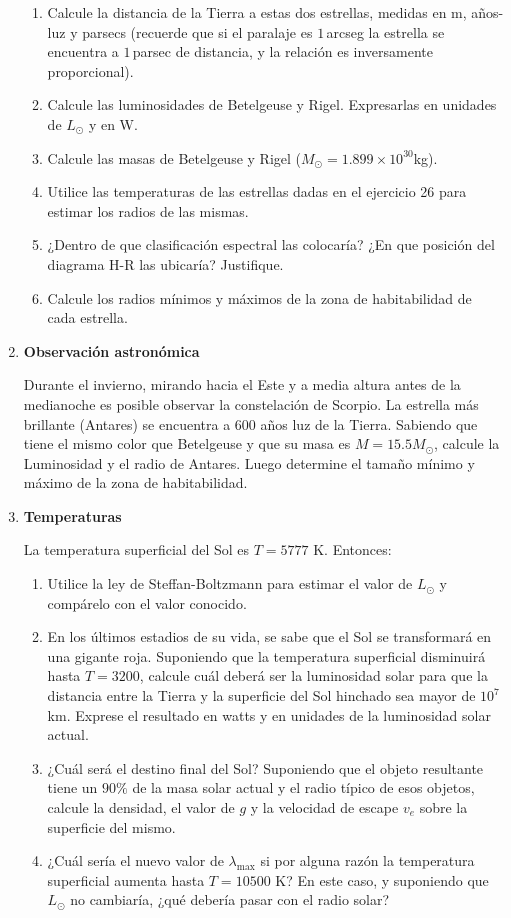 \documentclass[a4paper,12pt]{article}
\begin{document}
\begin{enumerate}
\begin{enumerate}
\item Calcule la distancia de la Tierra a estas dos estrellas, medidas en m,
años-luz y parsecs (recuerde que si el paralaje es $1$\,arcseg la estrella se
encuentra a $1$\,parsec de distancia, y la relación es inversamente
proporcional). 
\item Calcule las luminosidades de Betelgeuse y Rigel. Expresarlas en unidades
de $L_\odot$ y en W.
\item Calcule las masas de Betelgeuse y Rigel ($M_\odot =
1.899\times10^{30}$kg).
\item Utilice las temperaturas de las estrellas dadas en el ejercicio 26 para
estimar los radios de las mismas. 
\item ¿Dentro de que clasificación espectral las colocaría? ¿En que posición
del diagrama H-R las ubicaría? Justifique.
\item Calcule los radios mínimos y máximos de la zona de habitabilidad de cada estrella.
\end{enumerate}

\item{\bf{Observación astronómica}}

Durante el invierno, mirando hacia el Este y a media altura antes de la
medianoche es posible observar la constelación de Scorpio.
La estrella más brillante (Antares) se encuentra a 600 años luz de la Tierra.
Sabiendo que tiene el mismo color que Betelgeuse y que su masa es $M=15.5
M_\odot$, calcule la Luminosidad y el radio de Antares. Luego determine el tamaño mínimo y máximo de la zona de habitabilidad.

\item{\bf{Temperaturas}}

La temperatura superficial del Sol es $T=5777$ K. Entonces:

\begin{enumerate}
\item Utilice la ley de Steffan-Boltzmann para estimar el valor de $L_\odot$ y
compárelo con el valor conocido.
\item En los últimos estadios de su vida, se sabe que el Sol se transformará en
una gigante roja. Suponiendo que la temperatura superficial disminuirá hasta
$T=3200$, calcule cuál deberá ser la luminosidad solar para que la distancia
entre la Tierra y la superficie del Sol hinchado sea mayor de $10^7$ km.
Exprese el resultado en watts y en unidades de la luminosidad solar actual.
\item ¿Cuál será el destino final del Sol? Suponiendo que el objeto resultante
tiene un $90\%$ de la masa solar actual y el radio típico de esos objetos,
calcule la densidad, el valor de $g$ y la velocidad de escape $v_e$ sobre la
superficie del mismo.
\item ¿Cuál sería el nuevo valor de $\lambda_{\max}$ si por alguna razón la
temperatura superficial aumenta hasta $T = 10500$ K? En este caso, y suponiendo
que $L_\odot$ no cambiaría, ¿qué debería pasar con el radio solar?
\end{enumerate}


\end{enumerate}
\end{document}
